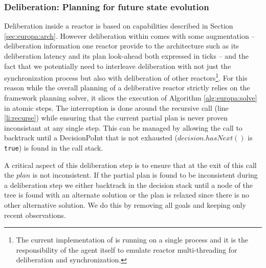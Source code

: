 \subsubsection{Deliberation: Planning for future state evolution}
\label{sec:arch:plan}

Deliberation inside a reactor is based on \eu capabilities described
in Section \ref{sec:europa:arch}. However deliberation within \rx
comes with some augmentation -- deliberation information one reactor
provide to the architecture such as its deliberation latency and its
plan look-ahead both expressed in ticks -- and the fact that we
potentially need to interleave deliberation with not just the
synchronization process but also with deliberation of other
reactors\footnote{The current implementation of \rx is running on a
  single process and it is the responsibility of the agent itself to
  emulate reactor multi-threading for deliberation and
  synchronization.}. For this reason while the overall planning of a
deliberative reactor strictly relies on the \eu framework planning
solver, it slices the execution of Algorithm \ref{alg:europa:solve} in
atomic steps. The interruption is done around the recursive call (line
\ref{li:recurse}) while ensuring that the current partial plan is
never proven inconsistant at any single step. This can be managed by
allowing the call to backtrack until a \textsf{DecisionPoInt} that is
not exhausted (\ie $decision.hasNext()$ is \texttt{true}) is found in
the call stack.

A critical aspect of this deliberation step is to ensure that at the
exit of this call the $plan$ is not inconsistent. %
If the partial plan is found to be inconsistent during a deliberation
step we either backtrack in the decision stack until a node of the
tree is found with an alternate solution or the plan is relaxed since
there is no other alternative solution. We do this by removing all
goals and keeping only recent observations. %


